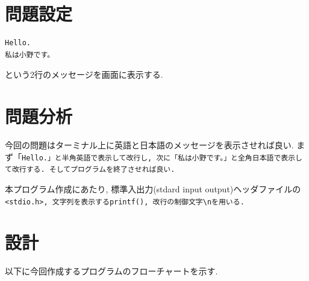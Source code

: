 \documentclass[a4paper, xelatex, ja=standard, 10.5pt]{bxjsarticle}
\begin{document}


\section{問題設定}
\begin{lstlisting}
Hello.
私は小野です。
\end{lstlisting}
という2行のメッセージを画面に表示する.

\section{問題分析}
今回の問題はターミナル上に英語と日本語のメッセージを表示させれば良い.
まず「\tt{Hello.}」と半角英語で表示して改行し,
次に「\tt{私は小野です。}」と全角日本語で表示して改行する.
そしてプログラムを終了させれば良い.

本プログラム作成にあたり,
標準入出力(stdard input output)ヘッダファイルの\tt{<stdio.h>},
文字列を表示する\tt{printf()},
改行の制御文字\tt{\textbackslash n}を用いる.

\section{設計}
以下に今回作成するプログラムのフローチャートを示す.
\end{document}
